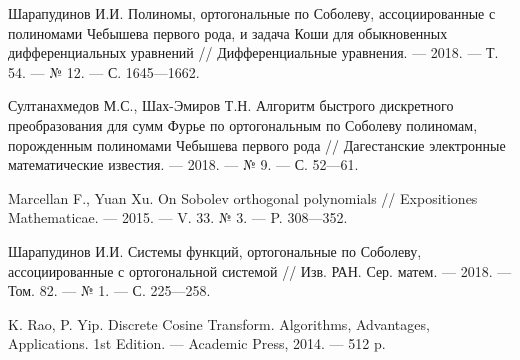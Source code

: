 \begin{thebibliography}{111}

 Шарапудинов И.И. Полиномы, ортогональные по Соболеву, ассоциированные с полиномами Чебышева первого рода, и задача Коши для обыкновенных дифференциальных уравнений // Дифференциальные уравнения. --- 2018. --- Т. 54. --- № 12. --- С. 1645---1662.

 Султанахмедов М.С., Шах-Эмиров Т.Н. Алгоритм быстрого дискретного преобразования для сумм Фурье по ортогональным по Соболеву полиномам, порожденным полиномами Чебышева первого рода // Дагестанские электронные математические известия. --- 2018. --- № 9. --- С. 52---61.

 Marcellan F., Yuan Xu. On Sobolev orthogonal polynomials // Expositiones Mathematicae. --- 2015. --- V. 33. № 3. --- P. 308---352.

 Шарапудинов И.И. Системы функций, ортогональные по Соболеву, ассоциированные с ортогональной системой // Изв. РАН. Сер. матем. --- 2018. --- Том. 82. --- № 1. --- С. 225---258.

K. Rao, P. Yip. Discrete Cosine Transform. Algorithms, Advantages, Applications. 1st Edition. --- Academic Press, 2014. --- 512 p.

\end{thebibliography}

